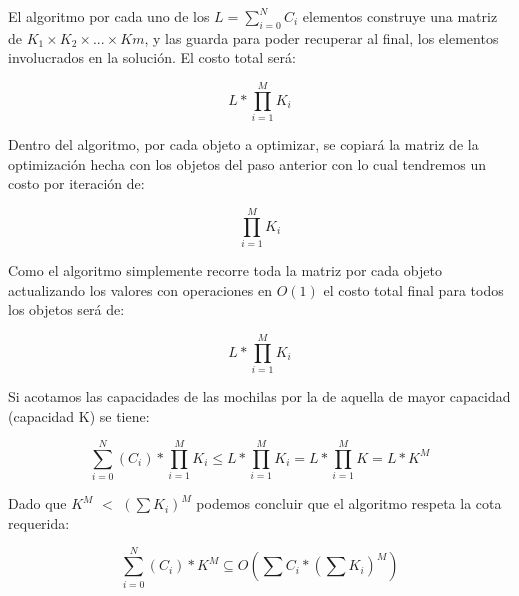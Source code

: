 El algoritmo por cada uno de los $L = \sum_{i = 0}^N C_{i}$ elementos construye una matriz de $K_{1} \times K_{2} \times...\times K{m}$, y las guarda para poder recuperar al final, los elementos involucrados en la solución.
El costo total será:

\[
L \ast \prod_{i=1}^{M}K_{i}
\]

Dentro del algoritmo, por cada objeto a optimizar, se copiará la matriz de la optimización hecha con los objetos del paso anterior con lo cual tendremos un costo por iteración de:

\[
\prod_{i=1}^{M}K_{i}
\]

Como el algoritmo simplemente recorre toda la matriz por cada objeto actualizando los valores con operaciones en $O(1)$ el costo total final para todos los objetos será de:

\[
L \ast \prod_{i=1}^{M}K_{i}
\]

Si acotamos las capacidades de las mochilas por la de aquella de mayor capacidad (capacidad K) se tiene:

\[
\sum_{i = 0}^N(C_{i}) \ast \prod_{i=1}^{M} K_{i} \leq
L \ast \prod_{i=1}^{M}K_{i} = L \ast \prod_{i=1}^{M}K = L \ast  K^{M}
\]  

Dado que $K^{M}$ $<$ $(\sum K_{i})^M$ podemos concluir que el algoritmo respeta la cota requerida:


\[
\sum_{i = 0}^N(C_{i}) \ast  K^{M} \subseteq O( \sum C_{i} \ast (\sum K_{i})^M)
\]